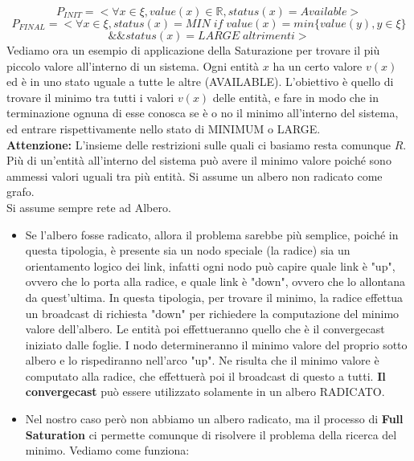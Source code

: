 $$P_{INIT} = < \forall x \in \xi, value(x) \in \mathbb{R}, status(x) =
    Available>$$
$$
    P_{FINAL} =   <
    \forall x \in \xi, status(x)= MIN \; if \; value(x) = min
    \{value(y), y \in \xi \}$$$$ \&\&  status(x) = LARGE \;altrimenti >$$
Vediamo ora un esempio di applicazione della Saturazione per trovare il più
piccolo valore all'interno di un sistema. Ogni entità $x$ ha un certo valore
$v(x)$ ed è in uno stato uguale a tutte le altre (AVAILABLE). L'obiettivo è
quello di trovare il minimo tra tutti i valori $v(x)$ delle entità, e fare in
modo che in terminazione ognuna di esse conosca se è o no il minimo all'interno
del sistema, ed entrare rispettivamente nello stato di MINIMUM o LARGE.\\
\textbf{Attenzione:} L'insieme delle restrizioni sulle quali ci basiamo resta
comunque $R$. Più di un'entità all'interno del sistema può avere il minimo
valore poiché sono ammessi valori uguali tra più entità. Si assume un albero non
radicato come grafo.\\
Si assume sempre rete ad Albero.
\begin{itemize}
    \item Se l'albero fosse radicato, allora il problema sarebbe più semplice,
          poiché in questa tipologia, è presente sia un nodo speciale (la radice) sia un
          orientamento logico dei link, infatti ogni nodo può capire quale link è "up",
          ovvero che lo porta alla radice, e quale link è "down", ovvero che lo
          allontana da quest'ultima. In questa tipologia, per trovare il minimo, la
          radice effettua un broadcast di richiesta "down" per richiedere la
          computazione del minimo valore dell'albero. Le entità poi effettueranno quello
          che è il convergecast iniziato dalle foglie. I nodo determineranno il minimo
          valore del proprio sotto albero e lo rispediranno nell'arco "up". Ne risulta
          che il minimo valore è computato alla radice, che effettuerà poi il broadcast
          di questo a tutti. \textbf{Il convergecast} può essere utilizzato solamente in
          un albero RADICATO.
    \item Nel nostro caso però non abbiamo un albero radicato, ma il processo di
          \textbf{Full Saturation} ci permette comunque di risolvere il problema della
          ricerca del minimo. Vediamo come funziona:
\end{itemize}

